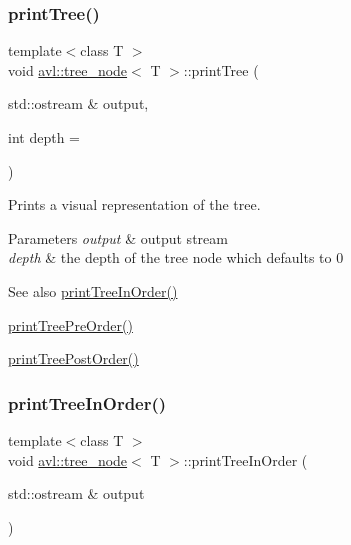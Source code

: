 \subsubsection{\texorpdfstring{print\+Tree()}{printTree()}}
{\footnotesize\ttfamily template$<$class T $>$ \\
void \hyperlink{classavl_1_1tree__node}{avl\+::tree\+\_\+node}$<$ T $>$\+::print\+Tree (\begin{DoxyParamCaption}\item[{std\+::ostream \&}]{output,  }\item[{int}]{depth = {} }\end{DoxyParamCaption})}

Prints a visual representation of the tree. 
\begin{DoxyParams}{Parameters}
{\em output} & output stream \\
\hline
{\em depth} & the depth of the tree node which defaults to 0 \\
\hline
\end{DoxyParams}
\begin{DoxySeeAlso}{See also}
\hyperlink{classavl_1_1tree__node_a51af0430883561e9d3293cb63e78003c}{print\+Tree\+In\+Order()} 

\hyperlink{classavl_1_1tree__node_a038a1d729f32ca094e8752aba6dd9120}{print\+Tree\+Pre\+Order()} 

\hyperlink{classavl_1_1tree__node_adb0751fd04db456d5afdbe5c898da41c}{print\+Tree\+Post\+Order()} 
\end{DoxySeeAlso}
\mbox{\label{classavl_1_1tree__node_a51af0430883561e9d3293cb63e78003c}} 
\subsubsection{\texorpdfstring{print\+Tree\+In\+Order()}{printTreeInOrder()}}
{\footnotesize\ttfamily template$<$class T $>$ \\
void \hyperlink{classavl_1_1tree__node}{avl\+::tree\+\_\+node}$<$ T $>$\+::print\+Tree\+In\+Order (\begin{DoxyParamCaption}\item[{std\+::ostream \&}]{output }\end{DoxyParamCaption})}

